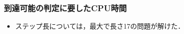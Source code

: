 \begin{frame}
  \frametitle{到達可能の判定に要したCPU時間}

  \begin{exampleblock}{}
    \centering
    \scalebox{0.75}{}
  \end{exampleblock}
  \begin{itemize}
    \item ステップ長については，最大で長さ17の問題が解けた．
  \end{itemize}
\end{frame}
